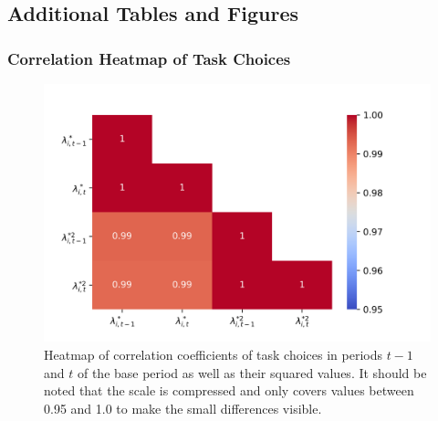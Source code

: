 \documentclass[../main.tex]{subfiles}
\begin{document}
\subsection{Additional Tables and Figures} \label{app:tables_and_figures}
\subsubsection{Correlation Heatmap of Task Choices}
\begin{figure}[!htbp]
	\centering
	\includegraphics[scale=0.7]{./FIG/corr_heatmap.png} 
	\caption{Heatmap of correlation coefficients of task choices in periods $t-1$ and $t$ of the base period as well as their squared values. It should be noted that the scale is compressed and only covers values between 0.95 and 1.0 to make the small differences visible.}
	\label{fig:corr_heatmap}
\end{figure}

\FloatBarrier
\end{document}
